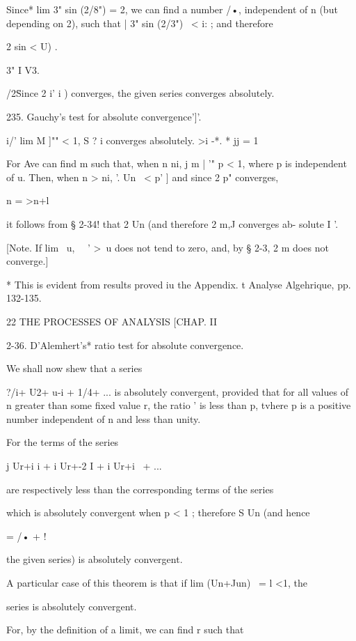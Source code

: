 Since* lim 3" sin (2/8") = 2, we can find a number /•, independent of
n (but depending on 2), such that | 3" sin (2/3") \ < i: ; and
therefore

2 sin < U) .



3" I V3.

  /2\" Since 2 i' i ) converges, the given series converges
absolutely.

235. Gauchy's test for absolute convergence']'.

i/' lim M ]"" < 1, S ? i converges absolutely. >i -*. * jj = 1

For Ave can find m such that, when n ni, j m | '" p < 1, where p is
independent of u. Then, when n > ni, '. Un \ < p' ] and since 2 p"
converges,

n = >n+l

it follows from § 2-34! that 2 Un (and therefore 2 m,J converges ab-
solute I '.

[Note. If lim \ u, \ \ ' >\, u does not tend to zero, and, by § 2-3, 2
m does not converge.]

* This is evident from results proved iu the Appendix. t Analyse
Algehrique, pp. 132-135.



22 THE PROCESSES OF ANALYSIS [CHAP. II

2-36. D'Alemhert's* ratio test for absolute convergence.

We shall now shew that a series

?/i+ U2+ u-i + 1/4+ ... is absolutely convergent, provided that for
all values of n greater than some fixed value r, the ratio ' is less
than p, tvhere p is a positive number independent of n and less than
unity.

For the terms of the series

j Ur+i i + i Ur+-2 I + i Ur+i \ + ...

are respectively less than the corresponding terms of the series

which is absolutely convergent when p < 1 ; therefore S Un (and hence

  = /• + !

the given series) is absolutely convergent.

A particular case of this theorem is that if lim (Un+Jun) \ = l <1,
the

series is absolutely convergent.

For, by the definition of a limit, we can find r such that



